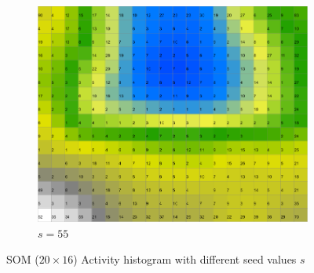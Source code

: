 \documentclass{acm_proc_article-sp}
\begin{document}
\begin{figure}
\begin{subfigure}[b]{0.30\linewidth}
        \includegraphics[width=\linewidth]{img/wine-newmid-activity-histogram-seed-55}
        \caption{$s=55$}
    \end{subfigure}
    \caption{SOM ($20\times16$) Activity histogram with different seed values $s$}
    \label{fig:wine-newmid-activity-histogram-seed}
\end{figure}
\end{document}
